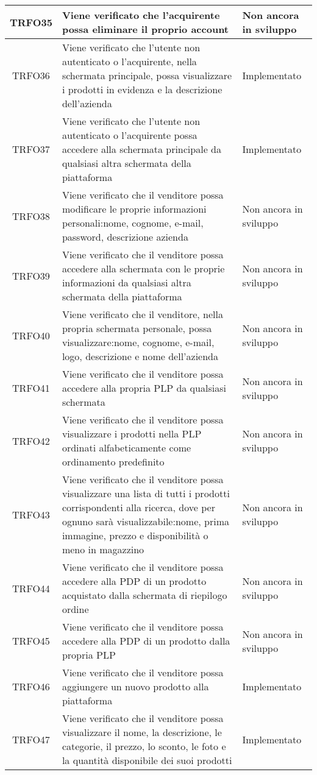 \begin{longtable}{|c| C{10cm} |C{3cm}|}
	TRFO35 & Viene verificato che l'acquirente possa eliminare il proprio account & Non ancora in sviluppo\\ \hline
	TRFO36 & Viene verificato che l'utente non autenticato o l'acquirente, nella schermata principale, possa visualizzare i prodotti in evidenza e la descrizione dell'azienda & Implementato\\ \hline
	TRFO37 & Viene verificato che l'utente non autenticato o l'acquirente possa accedere alla schermata principale da qualsiasi altra schermata della piattaforma & Implementato\\ \hline
    TRFO38 & Viene verificato che il venditore possa modificare le proprie informazioni personali:nome, cognome, e-mail, password, descrizione azienda & Non ancora in sviluppo\\ \hline
	TRFO39 & Viene verificato che il venditore possa accedere alla schermata con le proprie informazioni da qualsiasi altra schermata della piattaforma & Non ancora in sviluppo\\ \hline
    TRFO40 & Viene verificato che il venditore, nella propria schermata personale, possa visualizzare:nome, cognome, e-mail, logo, descrizione e nome dell'azienda & Non ancora in sviluppo\\ \hline
	TRFO41 & Viene verificato che il venditore possa accedere alla propria PLP da qualsiasi schermata & Non ancora in sviluppo\\ \hline
	TRFO42 & Viene verificato che il venditore possa visualizzare i prodotti nella PLP ordinati alfabeticamente come ordinamento predefinito & Non ancora in sviluppo\\ \hline
	TRFO43 & Viene verificato che il venditore possa visualizzare una lista di tutti i prodotti corrispondenti alla ricerca, dove per ognuno sarà visualizzabile:nome, prima immagine, prezzo e disponibilità o meno in magazzino & Non ancora in sviluppo\\ \hline
	TRFO44 & Viene verificato che il venditore possa accedere alla PDP di un prodotto acquistato dalla schermata di riepilogo ordine & Non ancora in sviluppo\\ \hline
	TRFO45 & Viene verificato che il venditore possa accedere alla PDP di un prodotto dalla propria PLP & Non ancora in sviluppo\\ \hline
    	TRFO46 & Viene verificato che il venditore possa aggiungere un nuovo prodotto alla piattaforma & Implementato\\ \hline
    	TRFO47 & Viene verificato che il venditore possa visualizzare il nome, la descrizione, le categorie, il prezzo, lo sconto, le foto e la quantità disponibile dei suoi prodotti & Implementato\\ \hline

\end{longtable}
